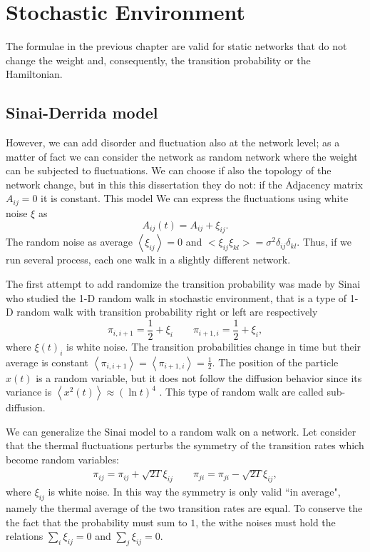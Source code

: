 \chapter{Stochastic Environment}

The formulae in the previous chapter are valid for static networks that do not change the weight and, consequently, the transition probability or the Hamiltonian.

\section{Sinai-Derrida model}
However, we can add disorder and fluctuation also at the network level; as a matter of fact we can consider the network as random network where the weight can be subjected to fluctuations. We can choose if also the topology of the network change, but in this this dissertation they do not: if the Adjacency matrix $A_{ij} = 0$ it is constant.
This model 
We can express the fluctuations using white noise $\xi$ as
\begin{equation}
    A_{ij}(t) = A_{ij} + \xi_{ij}.
\end{equation}
The random noise as average $\left<\xi_{ij}\right> = 0$ and $<\xi_{ij}\xi_{kl}>=\sigma^2\delta_{ij}\delta_{kl}$.
Thus, if we run several process, each one walk in a slightly different network.

The first attempt to add randomize the transition probability was made by Sinai \cite{Sinai, Derrida} who studied the 1-D random walk in stochastic environment, that is a type of 1-D random walk with transition probability right or left are respectively 
\begin{equation}
    \pi_{i,i+1} = \frac{1}{2}+ \xi_i \qquad \pi_{i+1,i} = \frac{1}{2}+ \xi_i,
\end{equation}
where $\xi(t)_i$ is white noise. The transition probabilities change in time but their average is constant $\left<\pi_{i,i+1}\right> = \left<\pi_{i+1,i}\right> = \frac{1}{2}$.
The position of the particle $x(t)$ is a random variable, but it does not follow the diffusion behavior since its variance is $\left<x^2(t)\right> \approx \left(\ln t\right)^4$ \cite{Bouchaud}. This type of random walk are called sub-diffusion.


We can generalize the Sinai model to a random walk on a network. Let consider that the thermal fluctuations perturbs the symmetry of the transition rates which become random variables:
\begin{eqnarray}
    \pi_{ij}= \pi_{ij} + \sqrt{2T}\xi_{ij} \qquad \pi_{ji}= \pi_{ji} -  \sqrt{2T}\xi_{ij},
\end{eqnarray}
where $\xi_{ij}$ is white noise. In this way the symmetry is only valid “in average", namely the thermal average of the two transition rates are equal. To conserve the the fact that the probability must sum to $1$, the withe noises must hold the relations $\sum_i \xi_{ij} = 0$ and  $\sum_j \xi_{ij} = 0$.

